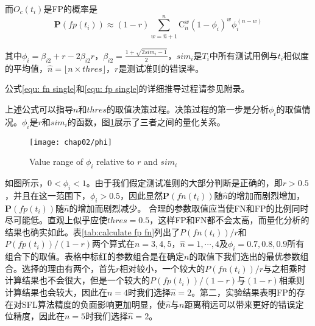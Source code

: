 而$O_c(t_i)$是FP的概率是
\begin{equation}
\label{equ: fp single}
\mathbf{P}(fp(t_i)) \approx (1 - r) \sum_{w = \hat{n} + 1}^{n} \mathrm{C}_n^w{(1 - \phi_i)^w} \phi_i^{(n-w)}
\end{equation}

其中$\phi_i = \beta_{i2} + r - 2 \beta_{i2} r$，$\beta_{i2} = \frac{1 + \sqrt{2 sim_i - 1}}{2}$，$sim_i$是$T_i$中所有测试用例与$t_i$相似度的平均值，$\hat{n} = \lfloor n \times thres \rfloor$，$r$是测试准则的错误率。

公式\ref{equ: fn single}和\ref{equ: fp single}的详细推导过程请参见附录。

上述公式可以指导$n$和$thres$的取值决策过程。决策过程的第一步是分析$\phi_i$的取值情况。$\phi_i$是$r$和$sim_i$的函数，图\ref{fig:phi}展示了三者之间的量化关系。
\begin{figure}
	\centering
	\texttt{[image: chap02/phi]}
	\caption{Value range of $\phi_i$ relative to $r$ and ${sim}_i$}
	\label{fig:phi}
\end{figure}
如图所示，$0 < \phi_i < 1$。由于我们假定测试准则的大部分判断是正确的，即$r > 0.5$，并且在这一范围下，$\phi_i > 0.5$，因此显然$\mathbf{P}(fn(t_i))$随$\hat{n}$的增加而剧烈增加，$\mathbf{P}(fp(t_i))$随$\hat{n}$的增加而剧烈减少。
合理的参数取值应当使FN和FP的比例同时尽可能低。直观上似乎应使$thres = 0.5$，这样FP和FN都不会太高，而量化分析的结果也确实如此。表\ref{tab:calculate fp fn}列出了$P(fn(t_i))/r$和$P(fp(t_i))/(1 - r)$两个算式在$n = 3, 4, 5$，$\hat{n} = 1,\cdots, 4$及$\phi_i = 0.7, 0.8, 0.9$所有组合下的取值。表格中标红的参数组合是在确定$n$的取值下我们选出的最优参数组合。选择的理由有两个，首先$r$相对较小，一个较大的$P(fn(t_i))/r$与之相乘时计算结果也不会很大，但是一个较大的$P(fp(t_i))/(1 - r)$与$(1-r)$相乘则计算结果也会较大，因此在$n = 4$时我们选择$\hat{n} = 2$。第二，实验结果表明FP的存在对SFL算法精度的负面影响更加明显，使$\hat{n}$与$n$距离稍远可以带来更好的错误定位精度，因此在$n = 5$时我们选择$\hat{n} = 2$。
